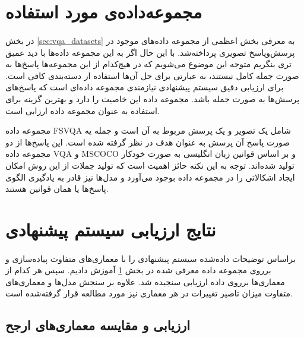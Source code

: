 \section{
  مجموعه‌داده‌ی مورد استفاده
 }
 \label{sec:dset}
\paragraph{}{
    در بخش 
    \ref{sec:vqa_datasets}
    به معرفی بخش اعظمی از مجموعه‌ داده‌های موجود
    در پرسش‌وپاسخ تصویری پرداخته‌شد. با این حال اگر
    به این مجموعه‌ داده‌ها با دید عمیق تری بنگریم متوجه این
    موضوع می‌شویم که در هیج‌کدام از این مجموعه‌ها پاسخ‌ها
    به صورت جمله کامل نیستند، به عبارتی برای 
    حل آن‌ها استفاده از دسته‌بندی کافی است. برای ارزیابی دقیق
    سیستم پیشنهادی نیازمندی مجموعه داده‌ای است که پاسخ‌های 
    پرسش‌ها به صورت جمله باشد. 
    مجموعه داده 
    \cite{shin2016color}
    این خاصیت را دارد و بهترین گزینه برای استفاده به عنوان 
    مجموعه داده ارزابی است. 

    مجموعه داده FSVQA 
    شامل یک تصویر و یک پرسش مربوط به آن است 
    و جمله یه صورت پاسخ آن پرسش به عنوان
    هدف در نظر گرفته شده است. 
    این پاسخ‌ها از دو مجموعه داده 
    VQA \cite{VQA}
    و 
    MSCOCO \cite{caesar2018coco}
    و بر اساس قوانین زبان 
    انگلیسی به صورت خودکار تولید شده‌اند. 
    توجه به این نکته حائز اهمیت است که تولید جملات از 
    این روش امکان 
    ایجاد اشکالاتی را در مجموعه داده بوجود می‌آورد 
    و مدل‌ها نیز قادر به یادگیری الگوی پاسخ‌ها
    یا همان قوانین هستند. 

}

\section{
  نتایج ارزیابی سیستم پیشنهادی
 }
 \label{sec:eval}
\paragraph{}{
    براساس توضیحات‌ داده‌شده سیستم پیشنهادی را با معماری‌های
    متفاوت پیاده‌سازی و برروی مجموعه داده معرفی شده در بخش 
    \ref{sec:dset}
    آموزش دادیم.
    سپس هر کدام از معماری‌ها برروی داده‌ ارزیابی
    سنجیده شد. علاوه بر سنجش مدل‌ها و معماری‌های متفاوت
    میزان تاصیر تغییرات در هر معماری نیز مورد مطالعه
    قرار گرفته‌‌شده‌ است. 
}

\subsection{ارزیابی و مقایسه معماری‌های ارجح}
